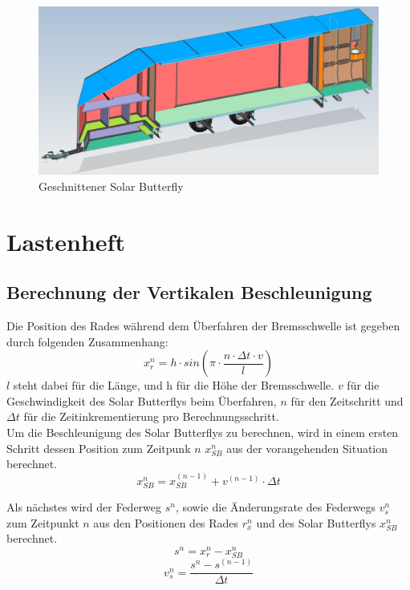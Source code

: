 \begin{figure}[H]
  \includegraphics[width=\linewidth]{04_Figures/SB13.png}
  \caption{Geschnittener Solar Butterfly}
  \label{img:SB13}
\end{figure}


\section{Lastenheft}
  \subsection{Berechnung der Vertikalen Beschleunigung}
  \label{Vertikale Beschleunigung}
  Die Position des Rades während dem Überfahren der Bremsschwelle ist gegeben durch folgenden Zusammenhang:
  \begin{equation}
    x_r^n = h \cdot sin\left(\pi \cdot \frac{n \cdot \Delta t \cdot v}{l}\right)
  \end{equation}
  $l$ steht dabei für die Länge, und h für die Höhe der Bremsschwelle. $v$ für die Geschwindigkeit des Solar Butterflys beim Überfahren, $n$ für den Zeitschritt und $\Delta t$ für die Zeitinkrementierung pro Berechnungsschritt.\\

  Um die Beschleunigung des Solar Butterflys zu berechnen, wird in einem ersten Schritt dessen Position zum Zeitpunk $n$ $x_{SB}^n$ aus der vorangehenden Situation berechnet.
  \begin{equation}
    x_{SB}^n = x_{SB}^{(n-1)} + v^{(n-1)} \cdot \Delta t
  \end{equation}

  Als nächstes wird der Federweg $s^n$, sowie die Änderungsrate des Federwegs $v_s^n$ zum Zeitpunkt $n$ aus den Positionen des Rades $r_x^n$ und des Solar Butterflys $x_{SB}^n$ berechnet.
  \begin{equation}
    s^n = x_r^n - x_{SB}^n
  \end{equation}
  \begin{equation}
    v_s^n = \frac{s^n - s^{(n-1)}}{\Delta t}
  \end{equation}

